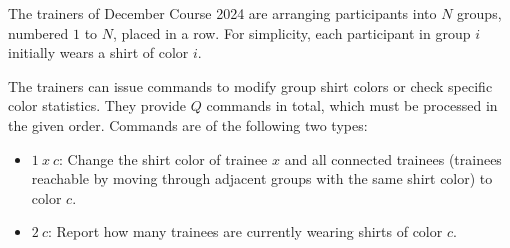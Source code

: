 The trainers of December Course 2024 are arranging participants into $N$ groups, numbered $1$ to $N$, placed in a row. For simplicity, each participant in group $i$ initially wears a shirt of color $i$.

The trainers can issue commands to modify group shirt colors or check specific color statistics. They provide $Q$ commands in total, which must be processed in the given order. Commands are of the following two types:

\begin{itemize}
\item $1\ x\ c$: Change the shirt color of trainee $x$ and all connected trainees (trainees reachable by moving through adjacent groups with the same shirt color) to color $c$.

\item $2\ c$: Report how many trainees are currently wearing shirts of color $c$.
\end{itemize}